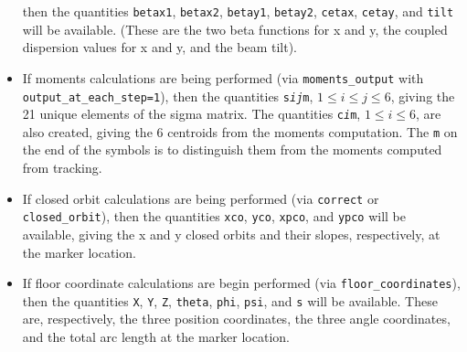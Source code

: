 \begin{itemize}
  then the quantities  \verb|betax1|, \verb|betax2|, \verb|betay1|, \verb|betay2|, \verb|cetax|, \verb|cetay|, and \verb|tilt| will be available.
  (These are the two beta functions for x and y, the coupled dispersion values for x and y, and the beam tilt).
\item If moments calculations are being performed (via {\tt moments\_output} with  {\tt output\_at\_each\_step=1}), then the quantities 
 {\tt s{\em i}{\em j}m}, $1 \leq i\leq j\leq 6$, giving the 21 unique elements of the sigma matrix.  The quantities {\tt c{\em i}m}, $1\leq i \leq 6$,
 are also created, giving the 6 centroids from the moments computation.  The
 {\tt m} on the end of the symbols is to distinguish them from the moments computed from tracking.
\item If closed orbit calculations are being performed (via {\tt correct} or {\tt closed\_orbit}), then
  the quantities {\tt xco}, {\tt yco}, {\tt xpco}, and {\tt ypco} will be available, giving the
  x and y closed orbits and their slopes, respectively, at the marker location.
\item If floor coordinate calculations are begin performed (via {\tt floor\_coordinates}), then the quantities
  {\tt X}, {\tt Y}, {\tt Z}, {\tt theta}, {\tt phi}, {\tt psi}, and {\tt s} will be available.  These are,
  respectively, the three position coordinates, the three angle coordinates, and the total arc length
  at the marker location.
\end{itemize}
